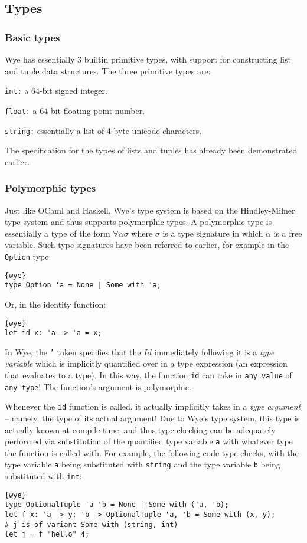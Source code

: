 \documentclass[a4paper, 12pt]{article}
\begin{document}
\subsection{Types}

\subsubsection{Basic types}

Wye has essentially 3 builtin primitive types, with support for constructing list and tuple data structures. The three primitive types are:

\texttt{int:} a 64-bit signed integer.

\texttt{float:} a 64-bit floating point number.

\texttt{string:} essentially a list of 4-byte unicode characters.

The specification for the types of lists and tuples has already been demonstrated earlier.

\subsubsection{Polymorphic types}

Just like OCaml and Haskell, Wye's type system is based on the Hindley-Milner type system and thus supports polymorphic types. A polymorphic type is essentially a type of the form $\forall \alpha \sigma$ where $\sigma$ is a type signature in which $\alpha$ is a free variable. Such type signatures have been referred to earlier, for example in the \texttt{Option} type:
\begin{lstlisting}{wye}
type Option 'a = None | Some with 'a;
\end{lstlisting}
Or, in the identity function:
\begin{lstlisting}{wye}
let id x: 'a -> 'a = x;
\end{lstlisting}
In Wye, the \texttt{'} token specifies that the $Id$ immediately following it is a \textit{type variable} which is implicitly quantified over in a type expression (an expression that evaluates to a type). In this way, the function \texttt{id} can take in \texttt{any value} of \texttt{any type}! The function's argument is polymorphic.

Whenever the \texttt{id} function is called, it actually implicitly takes in a \textit{type argument} -- namely, the type of its actual argument! Due to Wye's type system, this type is actually known at compile-time, and thus type checking can be adequately performed via substitution of the quantified type variable \texttt{a} with whatever type the function is called with. For example, the following code type-checks, with the type variable \texttt{a} being substituted with \texttt{string} and the type variable \texttt{b} being substituted with \texttt{int}:
\begin{lstlisting}{wye}
type OptionalTuple 'a 'b = None | Some with ('a, 'b);
let f x: 'a -> y: 'b -> OptionalTuple 'a, 'b = Some with (x, y);
# j is of variant Some with (string, int)
let j = f "hello" 4;
\end{lstlisting}
\end{document}
